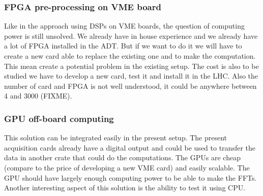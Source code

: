 \subsubsection{FPGA pre-processing on VME board}

Like in the approach using \glspl{DSP} on VME boards, the question of computing 
power is still unsolved. We already have in house experience and we already 
have a lot of \gls{FPGA} installed in the \gls{ADT}. But if we want to do it we 
will have to create a new card able to replace the existing one and to make the 
computation. This mean create a potential problem in the existing setup. The 
cost is also to be studied we have to develop a new card, test it and install 
it in the \gls{LHC}. Also the number of card and FPGA is not well understood,
it could be anywhere between 4 and 3000 (FIXME).

\subsubsection{GPU off-board computing}

This solution can be integrated easily in the present setup. The present 
acquisition cards already have a digital output and could be used to transfer
the data in another crate that could do the computations. The \glspl{GPU} are
cheap (compare to the price of developing a new \gls{VME} card) and easily
scalable. The \gls{GPU} should have largely enough computing power to be able
to make the \glspl{FFT}. Another interesting aspect of this solution is the 
ability to test it using \gls{CPU}.

